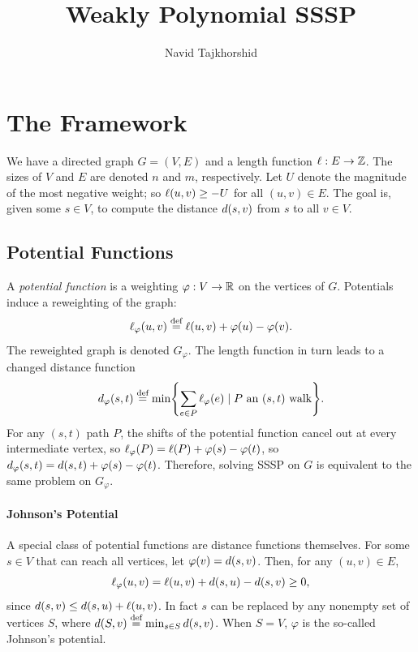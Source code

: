 \documentclass[12pt]{article}
\begin{document}
\title{Weakly Polynomial SSSP}
\author{Navid Tajkhorshid}

\maketitle

\section{The Framework}

We have a directed graph $G = (V, E)$ and a length function $\len : E \to \Z$.
The sizes of $V$ and $E$ are denoted $n$ and $m$, respectively. Let $U$ denote
the magnitude of the most negative weight; so $\len{u, v} \geq -U$ for all
$(u, v) \in E$. The goal is, given some $s \in V$, to compute the distance
$\dist{s, v}$ from $s$ to all $v \in V$.

\subsection{Potential Functions}

A \emph{potential function} is a weighting $\varphi : V \to \mathbb{R}$ on the vertices
of $G$. Potentials induce a reweighting of the graph:
\[
  \len{u, v}_\varphi \defeq \len{u, v} + \varphi(u) - \varphi(v).
\]
The reweighted graph is denoted $G_\varphi$. The length function in turn leads
to a changed distance function
\[
  \dist{s, t}_\varphi \defeq \min\Set{\sum_{e \in P} \len_\varphi(e) \mid
    \text{$P$ an $(s, t)$ walk}}.
\]
For any $(s, t)$ path $P$, the shifts of the potential function cancel out at
every intermediate vertex, so
$\len{P}_\varphi = \len{P} + \varphi(s) - \varphi(t)$, so
$\dist{s, t}_\varphi = \dist{s, t} + \varphi(s) - \varphi(t)$. Therefore,
solving SSSP on $G$ is equivalent to the same problem on $G_\varphi$.

\paragraph{Johnson's Potential}

A special class of potential functions are distance functions themselves. For
some $s \in V$ that can reach all vertices, let $\varphi(v) = \dist{s, v}$.
Then, for any $(u, v) \in E$,
\[
  \len{u, v}_\varphi = \len{u, v} + \dist{s, u} - \dist{s, v} \geq 0,
\]
since $\dist{s, v} \leq \dist{s, u} + \len{u, v}$. In fact $s$ can be replaced
by any nonempty set of vertices $S$, where
$\dist{S, v} \defeq \min_{s \in S} \dist{s, v}$. When $S = V$, $\varphi$ is the
so-called Johnson's potential.
\end{document}
